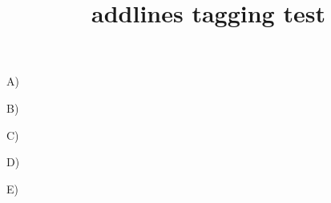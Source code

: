 \documentclass{article}
\title{addlines tagging test}
\begin{document}
\twocolumn \raggedright
A) \lipsum[1][1]  \par
  \addline
B) \lipsum[1][2-3]\par
C) \lipsum[1][4-5]\par
D) \lipsum[2][1]  \par
E) \lipsum[3]
\end{document}

